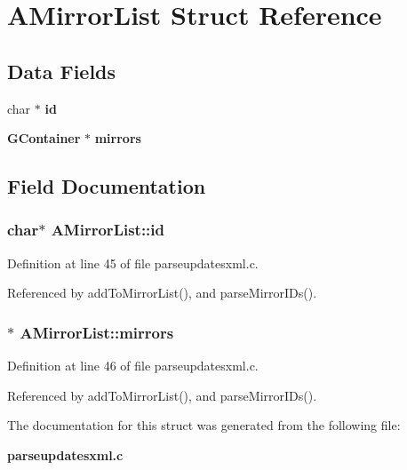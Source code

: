 \section{AMirror\-List Struct Reference}
\label{structAMirrorList}
\subsection*{Data Fields}
\begin{CompactItemize}
\item 
char $\ast$ {\bf id}
\item 
{\bf GContainer} $\ast$ {\bf mirrors}
\end{CompactItemize}


\subsection{Field Documentation}
\subsubsection{\setlength{\rightskip}{0pt plus 5cm}char$\ast$ {\bf AMirror\-List::id}}\label{structAMirrorList_o0}




Definition at line 45 of file parseupdatesxml.c.

Referenced by add\-To\-Mirror\-List(), and parse\-Mirror\-IDs().
\subsubsection{$\ast$ {\bf AMirror\-List::mirrors}}\label{structAMirrorList_o1}




Definition at line 46 of file parseupdatesxml.c.

Referenced by add\-To\-Mirror\-List(), and parse\-Mirror\-IDs().

The documentation for this struct was generated from the following file:\begin{CompactItemize}
\item 
{\bf parseupdatesxml.c}\end{CompactItemize}
